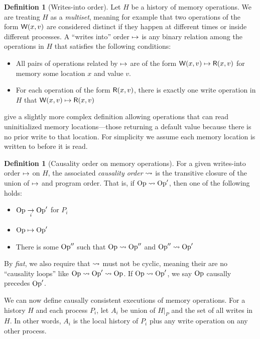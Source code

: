 \documentclass[]             %
{NASA}                       %
\theoremstyle{definition}
\newtheorem{definition}[theorem]{Definition}
\begin{document}
\begin{definition}[Writes-into order]
  Let $H$ be a history of memory operations. We are treating $H$ as a
  \emph{multiset}, meaning for example that two operations of the form
  $\mathsf{W}\!\left(x, v\right)$ are considered distinct if they happen at
  different times or inside different processes. A ``writes into''
  order $\mapsto$ is any binary relation among the operations
  in $H$ that satisfies the following conditions:
  \begin{itemize}
  \item All pairs of operations related by $\mapsto$ are of
    the form $\mathsf{W}\!\left(x, v\right) \mapsto \mathsf{R}\!\left(x, v\right)$ for
    memory some location $x$ and value $v$.
  \item For each operation of the form $\mathsf{R}\!\left(x, v\right)$, there is
    exactly one write operation in $H$ that
    $\mathsf{W}\!\left(x, v\right) \mapsto \mathsf{R}\!\left(x, v\right)$
  \end{itemize}
\end{definition}
\citationneeded give a slightly more complex definition allowing
operations that can read uninitialized memory locations---those
returning a default value because there is no prior write to that
location. For simplicity we assume each memory location is written to
before it is read.

\begin{definition}[Causality order on memory operations]
  \label{def:memorycausalprecedence}
  For a given writes-into order $\mapsto$ on
  $H$, the associated \emph{causality order}
  $\rightsquigarrow$ is the transitive closure of the union of
  $\mapsto$ and program order. That is, if $\mathrm{Op} \rightsquigarrow
  \mathrm{Op}'$, then one of the following holds:
  \begin{itemize}
  \item $\mathrm{Op} \underset{i}{\to} \mathrm{Op}'$ for $P_i$
  \item $\mathrm{Op} \mapsto \mathrm{Op}'$
  \item There is some $\mathrm{Op}''$ such that $\mathrm{Op} \rightsquigarrow \mathrm{Op}''$ and $\mathrm{Op}'' \rightsquigarrow \mathrm{Op}'$
  \end{itemize}
  By \emph{fiat}, we also require that $\rightsquigarrow$ must not be cyclic, meaning their are no ``causality loops'' like $\mathrm{Op} \rightsquigarrow \mathrm{Op}' \rightsquigarrow \mathrm{Op}$.
  If $\mathrm{Op} \rightsquigarrow \mathrm{Op}'$, we say $\mathrm{Op}$ causally precedes $\mathrm{Op}'$.
\end{definition}

We can now define causally consistent executions of memory
operations. For a history $H$ and each process $P_i$, let $A_i$ be
union of $H|_P$ and the set of all writes in $H$. In other words,
$A_i$ is the local history of $P_i$ plus any write operation on any
other process.
\end{document}
